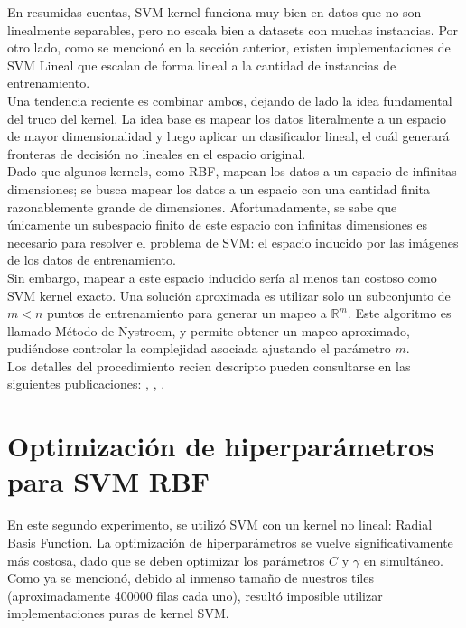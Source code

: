 En resumidas cuentas, SVM kernel funciona muy bien en datos que no son linealmente separables, pero no escala bien a datasets con muchas instancias. Por otro lado, como se mencionó en la sección anterior, existen implementaciones de SVM Lineal que escalan de forma lineal a la cantidad de instancias de entrenamiento. \\

Una tendencia reciente es combinar ambos, dejando de lado la idea fundamental del truco del kernel. La idea base es mapear los datos literalmente a un espacio de mayor dimensionalidad y luego aplicar un clasificador lineal, el cuál generará fronteras de decisión no lineales en el espacio original. \\

Dado que algunos kernels, como RBF, mapean los datos a un espacio de infinitas dimensiones; se busca mapear los datos a un espacio con una cantidad finita razonablemente grande de dimensiones. Afortunadamente, se sabe que únicamente un subespacio finito de este espacio con infinitas dimensiones es necesario para resolver el problema de SVM: el espacio inducido por las imágenes de los datos de entrenamiento. \\

Sin embargo, mapear a este espacio inducido sería al menos tan costoso como SVM kernel exacto. Una solución aproximada es utilizar solo un subconjunto de $m<n$ puntos de entrenamiento para generar un mapeo a $\mathbb{R}^m$. Este algoritmo es llamado Método de Nystroem, y permite obtener un mapeo aproximado, pudiéndose controlar la complejidad asociada ajustando el parámetro $m$. \\

Los detalles del procedimiento recien descripto pueden consultarse en las siguientes publicaciones: \cite{nystroem}, \cite{NIPS2012_621bf66d}, \cite{NIPS2007_013a006f}.

\section{Optimización de hiperparámetros para SVM RBF}

En este segundo experimento, se utilizó SVM con un kernel no lineal: Radial Basis Function. La optimización de hiperparámetros se vuelve significativamente más costosa, dado que se deben optimizar los parámetros $C$ y $\gamma$ en simultáneo. Como ya se mencionó, debido al inmenso tamaño de nuestros tiles (aproximadamente 400000 filas cada uno), resultó imposible utilizar implementaciones puras de kernel SVM. \\

